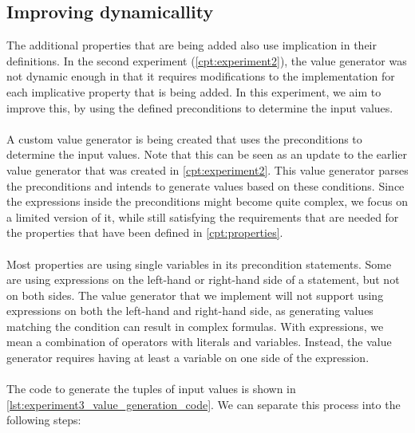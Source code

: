 \subsection{Improving dynamicallity}
The additional properties that are being added also use implication in their
definitions. In the second experiment (\autoref{cpt:experiment2}), the value
generator was not dynamic enough in that it requires modifications to the
implementation for each implicative property that is being added. In this
experiment, we aim to improve this, by using the defined preconditions to
determine the input values.\\
\\
A custom value generator is being created that uses the preconditions to determine the
input values. Note that this can be seen as an update to the earlier value generator that was
created in \autoref{cpt:experiment2}. This value generator parses the
preconditions and intends to generate values based on these conditions. Since
the expressions inside the preconditions might become quite complex, we focus on
a limited version of it, while still satisfying the requirements that are needed
for the properties that have been defined in \autoref{cpt:properties}.\\
\\
Most properties are using single variables in its precondition statements. Some
are using expressions on the left-hand or right-hand side of a statement, but
not on both sides. The value generator that we implement will not support using
expressions on both the left-hand and right-hand side, as generating values
matching the condition can result in complex formulas. With expressions, we mean a
combination of operators with literals and variables. Instead, the value generator requires having at least a variable on one side of the
expression.\\
\\
The code to generate the tuples of input values is shown in
\autoref{lst:experiment3_value_generation_code}. We can separate this process
into the following steps:
\def \valueGeneratorStepOne{Initialize value generation data (\hyperref[lst:experiment3_value_generation_code]{Line 7})}
\def \valueGeneratorStepTwo{Traverse and handle statements (\hyperref[lst:experiment3_value_generation_code]{Line 9-13})}
\def \valueGeneratorStepThree{Generate values for yet unassigned variables (\hyperref[lst:experiment3_value_generation_code]{Line 15-18})}
\def \valueGeneratorStepFour{Add values to resulting list (\hyperref[lst:experiment3_value_generation_code]{Line 21})}
